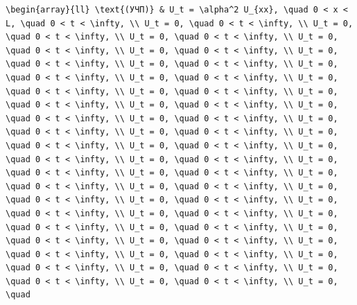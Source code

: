 \documentclass[
  ukrainian,
]{article}
\begin{document}
\begin{verbatim}
\begin{array}{ll} \text{(УЧП)} & U_t = \alpha^2 U_{xx}, \quad 0 < x < L, \quad 0 < t < \infty, \\ U_t = 0, \quad 0 < t < \infty, \\ U_t = 0, \quad 0 < t < \infty, \\ U_t = 0, \quad 0 < t < \infty, \\ U_t = 0, \quad 0 < t < \infty, \\ U_t = 0, \quad 0 < t < \infty, \\ U_t = 0, \quad 0 < t < \infty, \\ U_t = 0, \quad 0 < t < \infty, \\ U_t = 0, \quad 0 < t < \infty, \\ U_t = 0, \quad 0 < t < \infty, \\ U_t = 0, \quad 0 < t < \infty, \\ U_t = 0, \quad 0 < t < \infty, \\ U_t = 0, \quad 0 < t < \infty, \\ U_t = 0, \quad 0 < t < \infty, \\ U_t = 0, \quad 0 < t < \infty, \\ U_t = 0, \quad 0 < t < \infty, \\ U_t = 0, \quad 0 < t < \infty, \\ U_t = 0, \quad 0 < t < \infty, \\ U_t = 0, \quad 0 < t < \infty, \\ U_t = 0, \quad 0 < t < \infty, \\ U_t = 0, \quad 0 < t < \infty, \\ U_t = 0, \quad 0 < t < \infty, \\ U_t = 0, \quad 0 < t < \infty, \\ U_t = 0, \quad 0 < t < \infty, \\ U_t = 0, \quad 0 < t < \infty, \\ U_t = 0, \quad 0 < t < \infty, \\ U_t = 0, \quad 0 < t < \infty, \\ U_t = 0, \quad 0 < t < \infty, \\ U_t = 0, \quad 0 < t < \infty, \\ U_t = 0, \quad 0 < t < \infty, \\ U_t = 0, \quad 0 < t < \infty, \\ U_t = 0, \quad 0 < t < \infty, \\ U_t = 0, \quad 0 < t < \infty, \\ U_t = 0, \quad 0 < t < \infty, \\ U_t = 0, \quad 0 < t < \infty, \\ U_t = 0, \quad 0 < t < \infty, \\ U_t = 0, \quad 0 < t < \infty, \\ U_t = 0, \quad 0 < t < \infty, \\ U_t = 0, \quad 0 < t < \infty, \\ U_t = 0, \quad 0 < t < \infty, \\ U_t = 0, \quad 
\end{verbatim}
\end{document}

